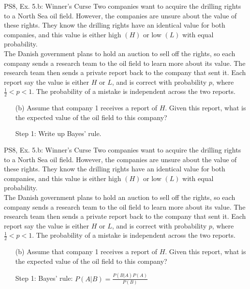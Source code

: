 \begin{frame}{PS8, Ex. 5.b: Winner's Curse}
      Two companies want to acquire the drilling rights to a North Sea oil field. However, the companies are unsure about the value of these rights. They know the drilling rights have an identical value for both companies, and this value is either high $(H)$ or low $(L)$ with equal probability.\\\medskip
      The Danish government plans to hold an auction to sell off the rights, so each company sends a research team to the oil field to learn more about its value. The research team then sends a private report back to the company that sent it. Each report say the value is either $H$ or $L$, and is correct with probability $p$, where $\frac{1}{2} < p < 1$. The probability of a mistake is independent across the two reports.
      \begin{itemize}
        \item[(b)] Assume that company 1 receives a report of $H$. Given this report, what is the expected value of the oil field to this company?
        \item[Step 1:] Write up Bayes' rule.
      \end{itemize}
      \vfill\null
\end{frame}
\begin{frame}{PS8, Ex. 5.b: Winner's Curse}
      Two companies want to acquire the drilling rights to a North Sea oil field. However, the companies are unsure about the value of these rights. They know the drilling rights have an identical value for both companies, and this value is either high $(H)$ or low $(L)$ with equal probability.\\\medskip
      The Danish government plans to hold an auction to sell off the rights, so each company sends a research team to the oil field to learn more about its value. The research team then sends a private report back to the company that sent it. Each report say the value is either $H$ or $L$, and is correct with probability $p$, where $\frac{1}{2} < p < 1$. The probability of a mistake is independent across the two reports.
      \begin{itemize}
        \item[(b)] Assume that company 1 receives a report of $H$. Given this report, what is the expected value of the oil field to this company?
        \item[Step 1:] Bayes' rule: $P(A|B)=\frac{P(B|A)P(A)}{P(B)}$
      \end{itemize}
      \vfill\null
\end{frame}
